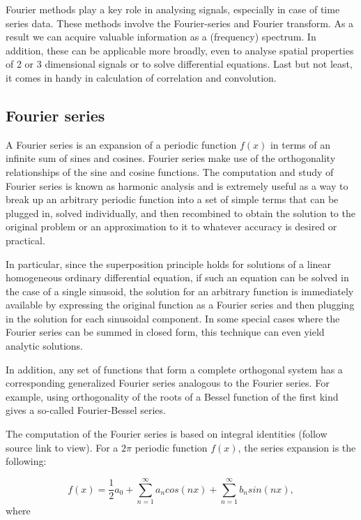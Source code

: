 \documentclass[12pt]{article}
\theoremstyle{plain}
\begin{document}
Fourier methods play a key role in analysing signals, especially in case of time series data. These methods involve the Fourier-series and Fourier transform. As a result we can acquire valuable information as a (frequency) spectrum. In addition, these can be applicable more broadly, even to analyse spatial properties of 2 or 3 dimensional signals or to solve differential equations. Last but not least, it comes in handy in calculation of correlation and convolution.

\subsection{Fourier series}

A Fourier series is an expansion of a periodic function $f(x)$ in terms of an infinite sum of sines and cosines. Fourier series make use of the orthogonality relationships of the sine and cosine functions. The computation and study of Fourier series is known as harmonic analysis and is extremely useful as a way to break up an arbitrary periodic function into a set of simple terms that can be plugged in, solved individually, and then recombined to obtain the solution to the original problem or an approximation to it to whatever accuracy is desired or practical. 

In particular, since the superposition principle holds for solutions of a linear homogeneous ordinary differential equation, if such an equation can be solved in the case of a single sinusoid, the solution for an arbitrary function is immediately available by expressing the original function as a Fourier series and then plugging in the solution for each sinusoidal component. In some special cases where the Fourier series can be summed in closed form, this technique can even yield analytic solutions.

In addition, any set of functions that form a complete orthogonal system has a corresponding generalized Fourier series analogous to the Fourier series. For example, using orthogonality of the roots of a Bessel function of the first kind gives a so-called Fourier-Bessel series.

The computation of the Fourier series is based on integral identities (follow source link to view). For a $2 \pi$ periodic function $f(x)$, the series expansion is the following:

\begin{equation}
f(x) = \frac{1}{2} a_0 + \sum_{n=1}^{\infty} a_n cos(n x) + \sum_{n=1}^{\infty} b_n sin(n x),
\end{equation}
where 
\end{document}
